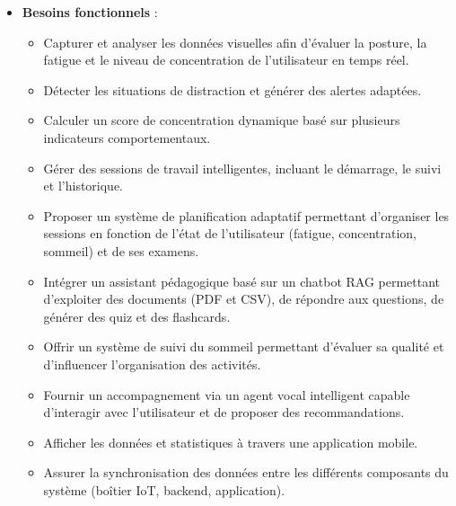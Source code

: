 \vspace{0.5em}
\begin{itemize}
    \item \textbf{Besoins fonctionnels} :
    \begin{itemize}
        \item Capturer et analyser les données visuelles afin d'évaluer la posture, la fatigue et le niveau de concentration de l'utilisateur en temps réel.
        \item Détecter les situations de distraction et générer des alertes adaptées.
        \item Calculer un score de concentration dynamique basé sur plusieurs indicateurs comportementaux.
        \item Gérer des sessions de travail intelligentes, incluant le démarrage, le suivi et l'historique.
        \item Proposer un système de planification adaptatif permettant d'organiser les sessions en fonction de l'état de l'utilisateur (fatigue, concentration, sommeil) et de ses examens.
        \item Intégrer un assistant pédagogique basé sur un chatbot \ac{RAG} permettant d'exploiter des documents (PDF et CSV), de répondre aux questions, de générer des quiz et des flashcards.
        \item Offrir un système de suivi du sommeil permettant d'évaluer sa qualité et d'influencer l'organisation des activités.
        \item Fournir un accompagnement via un agent vocal intelligent capable d'interagir avec l'utilisateur et de proposer des recommandations.
        \item Afficher les données et statistiques à travers une application mobile.
        \item Assurer la synchronisation des données entre les différents composants du système (boîtier \ac{IoT}, backend, application).
    \end{itemize}


\end{itemize}
